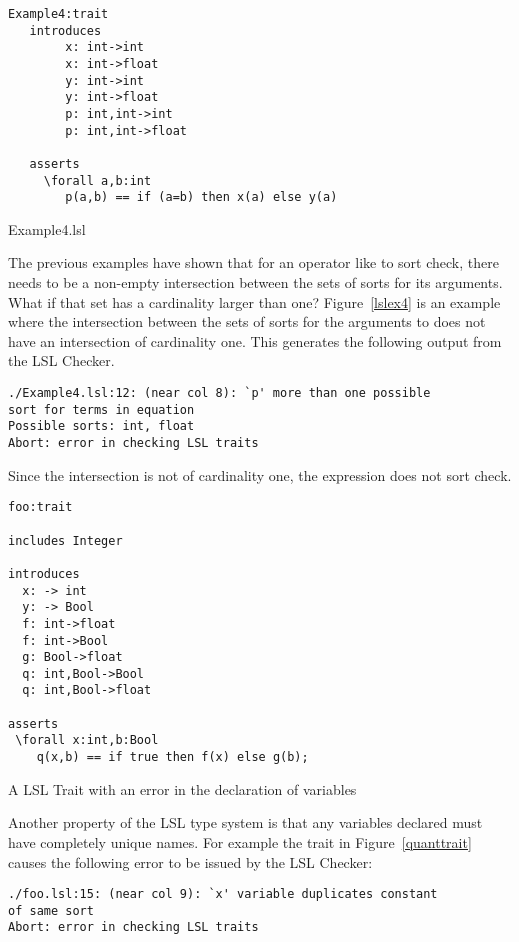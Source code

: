 \begin{BFIGURE}
\begin{verbatim}
Example4:trait
   introduces
        x: int->int
        x: int->float
        y: int->int
        y: int->float
        p: int,int->int
        p: int,int->float

   asserts
     \forall a,b:int
        p(a,b) == if (a=b) then x(a) else y(a)
\end{verbatim}
\caption{Example4.lsl}
\label{lslex4}
\end{BFIGURE}

The previous examples have shown that for an operator like
\reserved{==} to sort check, there needs to be a non-empty intersection between
the sets of sorts for its arguments. What if that set has a
cardinality larger than one? Figure~\ref{lslex4} is an example where
the intersection between the sets of sorts for the arguments to
\reserved{==} does not have an intersection of cardinality one. This
generates the following output from the LSL Checker.
\newpage

\begin{verbatim}
./Example4.lsl:12: (near col 8): `p' more than one possible 
sort for terms in equation 
Possible sorts: int, float 
Abort: error in checking LSL traits
\end{verbatim}

\noindent Since the intersection is not of cardinality one, the
expression does not sort check.

\begin{BFIGURE}
\begin{verbatim}
foo:trait

includes Integer

introduces
  x: -> int
  y: -> Bool
  f: int->float
  f: int->Bool
  g: Bool->float
  q: int,Bool->Bool
  q: int,Bool->float

asserts
 \forall x:int,b:Bool
    q(x,b) == if true then f(x) else g(b);
\end{verbatim}
\caption{A LSL Trait with an error in the declaration of variables}
\label{quanttrait}
\end{BFIGURE}

Another property of the LSL type system is that any variables declared
must have completely unique names. For example the trait in
Figure~\ref{quanttrait} causes the following error to be issued by the
LSL Checker:

\begin{verbatim}
./foo.lsl:15: (near col 9): `x' variable duplicates constant 
of same sort
Abort: error in checking LSL traits
\end{verbatim}

